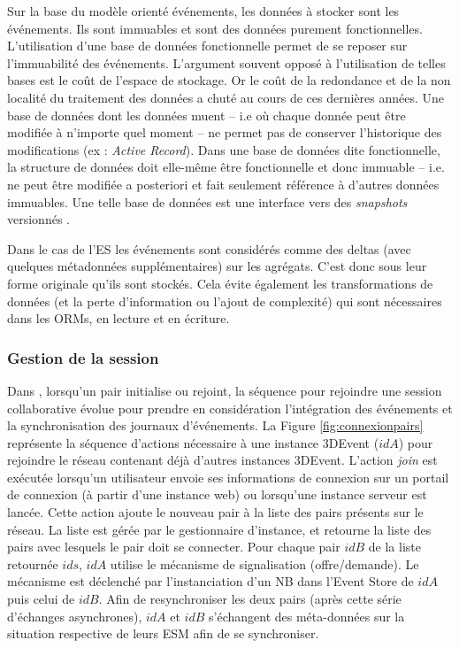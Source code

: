 Sur la base du modèle orienté événements, les données à stocker sont les 
événements. Ils sont immuables et 
sont des données purement fonctionnelles.
L'utilisation d'une base de données fonctionnelle permet de se reposer sur 
l'immuabilité des événements.
L'argument souvent opposé à l'utilisation de telles bases est le coût de l'espace de 
stockage. Or le coût de la redondance et de la non localité du traitement des 
données a chuté au cours de ces dernières années. 
Une base de données dont les données muent -- i.e où chaque donnée peut être 
modifiée à n'importe quel moment -- ne permet pas de conserver l'historique des 
modifications (ex : \textit{Active Record}). Dans une base de données dite 
fonctionnelle, la structure de données doit elle-même être fonctionnelle et donc 
immuable -- i.e. ne peut être modifiée a posteriori et fait seulement référence à 
d'autres données immuables. Une telle base de données est \og une interface vers 
des \textit{snapshots} versionnés\fg{} \cite{Meric2012}.

Dans le cas de l'\gls{ES} les événements sont considérés comme des deltas 
(avec quelques métadonnées supplémentaires) sur les agrégats. C'est donc sous 
leur forme originale qu'ils sont stockés. Cela évite également les transformations 
de données (et la perte d'information ou l'ajout de complexité) qui sont nécessaires 
dans les \glspl{ORM}, en lecture et en écriture.

\subsubsection{Gestion de la session}
Dans \cite{Desprat2017}, lorsqu'un pair initialise ou rejoint, la séquence pour 
rejoindre une session collaborative évolue 
pour prendre en considération l'intégration des événements et la synchronisation 
des journaux d'événements.
La Figure \ref{fig:connexionpairs} représente la séquence d'actions nécessaire à 
une instance 3DEvent ($idA$) pour rejoindre le réseau contenant déjà d'autres 
instances 3DEvent. L'action \textit{join} est exécutée lorsqu'un utilisateur envoie 
ses informations de connexion sur un portail de connexion (à partir d'une instance 
web) ou lorsqu'une instance serveur est lancée. Cette action ajoute le nouveau 
pair à la liste des pairs présents sur le réseau. La liste est gérée par le 
gestionnaire 
d'instance, et retourne la liste des pairs avec lesquels le pair doit se connecter. 
Pour chaque pair $idB$ de la liste retournée $ids$, $idA$ utilise le mécanisme de 
signalisation (offre/demande). Le mécanisme est déclenché par l'instanciation d'un 
\gls{NB} dans l'Event Store de $idA$ 
puis celui de $idB$. Afin de resynchroniser les deux pairs (après cette série 
d'échanges asynchrones), $idA$ et $idB$ s'échangent des méta-données sur la 
situation respective de leurs \gls{ESM} afin de se synchroniser.

